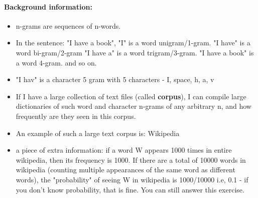\documentclass[11pt,a4paper]{article}
\begin{document}
\paragraph{Background information:}
\begin{itemize}
\item n-grams are sequences of n-words.
\item In the sentence: "I have a book", "I" is a word unigram/1-gram. "I have" is a word bi-gram/2-gram "I have a" is a word trigram/3-gram. "I have a book" is a word 4-gram. and so on.
\item "I hav" is a character 5 gram with 5 characters - I, space, h, a, v
\item If I have a large collection of text files (called \textbf{corpus}), I can compile large dictionaries of such word and character n-grams of any arbitrary n, and how frequently are they seen in this corpus.
\item An example of such a large text corpus is: Wikipedia
\item  a piece of extra information: if a word W appears 1000 times in entire wikipedia, then its frequency is 1000. If there are a total of 10000 words in wikipedia (counting multiple appearances of the same word as different words), the "probability" of seeing W in wikipedia is 1000/10000 i.e, 0.1 - if you don't know probability, that is fine. You can still answer this exercise. 
\end{itemize}
\end{document}
